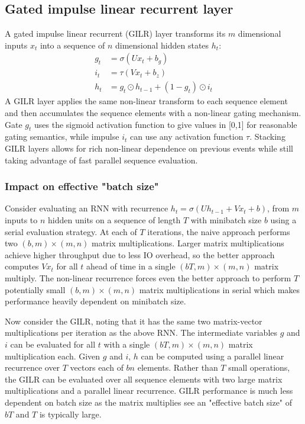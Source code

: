 \documentclass{article}
\begin{document}
\subsection{Gated impulse linear recurrent layer}
A gated impulse linear recurrent (GILR) layer transforms its $m$ dimensional inputs $x_t$ into a sequence of $n$ dimensional hidden states $h_t$:
\begin{align*}
g_t &= \sigma(Ux_t + b_g) \\
i_t &= \tau(Vx_t + b_z) \\
h_t &= g_t \odot h_{t-1} + (1-g_t)\odot i_t
\end{align*}
A GILR layer applies the same non-linear transform to each sequence element and
then accumulates the sequence elements with a non-linear gating mechanism. Gate
$g_t$ uses the sigmoid activation function to give values in [0,1] for
reasonable gating semantics, while impulse $i_t$ can use any activation function
$\tau$. Stacking GILR layers allows for rich non-linear dependence on previous
events while still taking advantage of fast parallel sequence evaluation.

\subsubsection{Impact on effective "batch size"}
Consider evaluating an RNN with recurrence $h_t = \sigma(Uh_{t-1} + Vx_t + b)$,
from $m$ inputs to $n$ hidden units on a sequence of length $T$ with minibatch
size $b$ using a serial evaluation strategy. At each of $T$ iterations, the
naive approach performs two $(b, m) \times (m, n)$ matrix
multiplications. Larger matrix multiplications achieve higher throughput due to
less IO overhead, so the better approach computes $Vx_t$ for all $t$ ahead of
time in a single $(bT, m) \times (m, n)$ matrix multiply. The non-linear
recurrence forces even the better approach to perform $T$ potentially small $(b,
m) \times (m, n)$ matrix multiplications in serial which makes performance
heavily dependent on minibatch size.

Now consider the GILR, noting that it has the same two matrix-vector
multiplications per iteration as the above RNN. The intermediate variables $g$
and $i$ can be evaluated for all $t$ with a single $(bT, m) \times (m, n)$
matrix multiplication each. Given $g$ and $i$, $h$ can be computed using a
parallel linear recurrence over $T$ vectors each of $bn$ elements. Rather than
$T$ small operations, the GILR can be evaluated over all sequence elements with
two large matrix multiplications and a parallel linear recurrence. GILR performance
is much less dependent on batch size as the matrix multiplies see an "effective
batch size" of $bT$ and $T$ is typically large.
\end{document}
